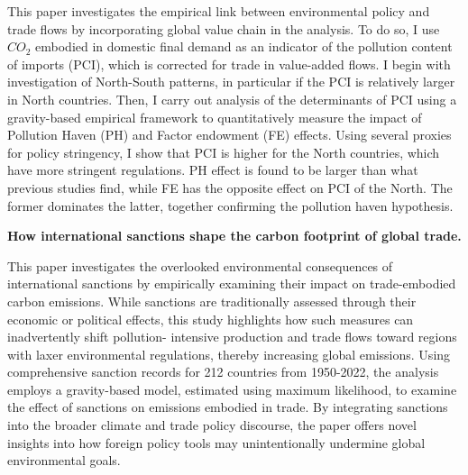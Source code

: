  \parbox{\textwidth}{This paper investigates the empirical link between environmental policy and trade flows by incorporating global value chain in the analysis. To do so, I use $CO_{2}$ embodied in domestic final demand as an indicator of the pollution content of imports (PCI), which is corrected for trade in value-added flows. I begin with investigation of North-South patterns, in particular if the PCI is relatively larger in North countries. Then, I carry out analysis of the determinants of PCI using a gravity-based empirical framework to quantitatively measure the impact of Pollution Haven (PH) and Factor endowment (FE) effects. Using several proxies for policy stringency, I show that PCI is higher for the North countries, which have more stringent regulations.  PH effect is found to be larger than what previous studies find, while FE has the opposite effect on PCI of the North. The former dominates the latter, together confirming the pollution haven hypothesis.}

\vspace{1em}
\textbf{How international sanctions shape the carbon footprint of global trade.}
\vspace{1em}

 \parbox{\textwidth}{This paper investigates the overlooked environmental consequences of international sanctions by empirically examining their impact on trade-embodied carbon emissions. While sanctions are traditionally assessed through their economic or political effects, this study highlights how such measures can inadvertently shift pollution- intensive production and trade flows toward regions with laxer environmental regulations, thereby increasing global emissions. Using comprehensive sanction records for 212 countries from 1950-2022, the analysis employs a gravity-based model, estimated using maximum likelihood, to examine the effect of sanctions on emissions embodied in trade. By integrating sanctions into the broader climate and trade policy discourse, the paper offers novel insights into how foreign policy tools may unintentionally undermine global environmental goals.}




